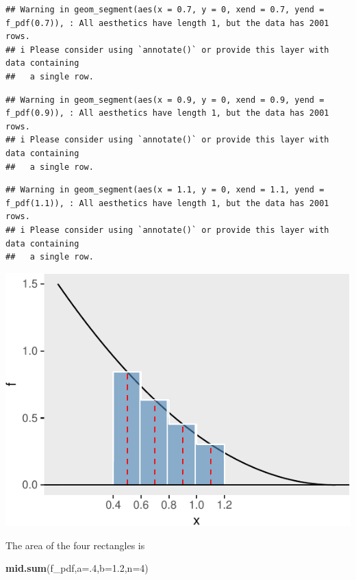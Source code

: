 \documentclass[
]{book}
\newenvironment{Shaded}{\begin{snugshade}}{\end{snugshade}}
\newcommand{\AttributeTok}[1]{\textcolor[rgb]{0.13,0.29,0.53}{#1}}
\newcommand{\DecValTok}[1]{\textcolor[rgb]{0.00,0.00,0.81}{#1}}
\newcommand{\FloatTok}[1]{\textcolor[rgb]{0.00,0.00,0.81}{#1}}
\newcommand{\FunctionTok}[1]{\textcolor[rgb]{0.13,0.29,0.53}{\textbf{#1}}}
\newcommand{\NormalTok}[1]{#1}
\theoremstyle{definition}
\theoremstyle{definition}
\theoremstyle{definition}
\theoremstyle{definition}
\theoremstyle{remark}
\begin{document}
\begin{verbatim}
## Warning in geom_segment(aes(x = 0.7, y = 0, xend = 0.7, yend = f_pdf(0.7)), : All aesthetics have length 1, but the data has 2001 rows.
## i Please consider using `annotate()` or provide this layer with data containing
##   a single row.
\end{verbatim}

\begin{verbatim}
## Warning in geom_segment(aes(x = 0.9, y = 0, xend = 0.9, yend = f_pdf(0.9)), : All aesthetics have length 1, but the data has 2001 rows.
## i Please consider using `annotate()` or provide this layer with data containing
##   a single row.
\end{verbatim}

\begin{verbatim}
## Warning in geom_segment(aes(x = 1.1, y = 0, xend = 1.1, yend = f_pdf(1.1)), : All aesthetics have length 1, but the data has 2001 rows.
## i Please consider using `annotate()` or provide this layer with data containing
##   a single row.
\end{verbatim}

\includegraphics{math340-notes_files/figure-latex/plot sum-1.pdf}

The area of the four rectangles is

\begin{Shaded}
\begin{Highlighting}[]
\FunctionTok{mid.sum}\NormalTok{(f\_pdf,}\AttributeTok{a=}\NormalTok{.}\DecValTok{4}\NormalTok{,}\AttributeTok{b=}\FloatTok{1.2}\NormalTok{,}\AttributeTok{n=}\DecValTok{4}\NormalTok{)}
\end{Highlighting}
\end{Shaded}
\end{document}
